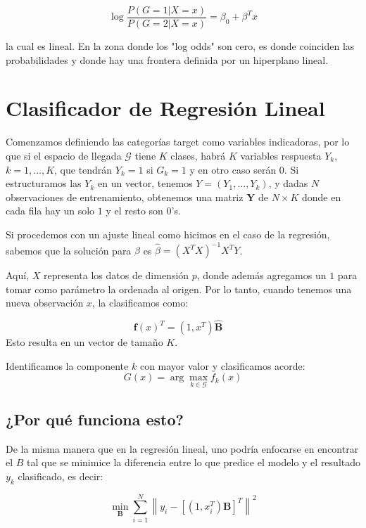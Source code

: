 \documentclass[aps,onecolumn,12pt,notitlepage]{revtex4-1}
\begin{document}
\[
\log \frac{P(G=1|X=x)}{P(G=2|X=x)} = \beta_0 + \beta^T x
\]

la cual es lineal. En la zona donde los "log odds" son cero, es donde coinciden las probabilidades y donde hay una frontera definida por un hiperplano lineal.

\section*{Clasificador de Regresión Lineal}

Comenzamos definiendo las categorías target como variables indicadoras, por lo que si el espacio de llegada \(\mathcal{G}\) tiene \(K\) clases, habrá \(K\) variables respuesta \(Y_k\), \(k = 1, \ldots, K\), que tendrán \(Y_k = 1\) si \(G_k = 1\) y en otro caso serán \(0\). Si estructuramos las \(Y_k\) en un vector, tenemos \(Y = (Y_1, \ldots, Y_k)\), y dadas \(N\) observaciones de entrenamiento, obtenemos una matriz \(\mathbf{Y}\) de \(N \times K\) donde en cada fila hay un solo \(1\) y el resto son \(0\)'s.

Si procedemos con un ajuste lineal como hicimos en el caso de la regresión, sabemos que la solución para \(\beta\) es \(\hat{\beta} = (X^TX)^{-1}X^T Y\).

Aquí, \(X\) representa los datos de dimensión \(p\), donde además agregamos un \(1\) para tomar como parámetro la ordenada al origen. Por lo tanto, cuando tenemos una nueva observación \(x\), la clasificamos como:

\begin{equation}
\mathbf{f}(x)^T = (1, x^T) \hat{\mathbf{B}} \quad
\end{equation}
Esto resulta en un vector de tamaño \(K\).

Identificamos la componente \(k\) con mayor valor y clasificamos acorde:
\begin{equation}
G(x) = \arg\max_{k \in \mathcal{G}} f_k(x)
\end{equation}

\subsection*{¿Por qué funciona esto?}

De la misma manera que en la regresión lineal, uno podría enfocarse en encontrar el \(B\) tal que se minimice la diferencia entre lo que predice el modelo y el resultado \(y_k\) clasificado, es decir:

\[
\min_{\mathbf{B}} \sum_{i=1}^{N} \left\| y_i - \left[(1, x_i^T)\mathbf{B}\right]^T \right\|^2
\]
\end{document}
